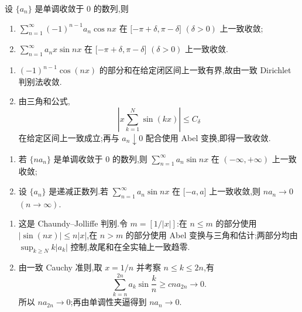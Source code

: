 \begin{example}
    设 $\{a_n\}$ 是单调收敛于 $0$ 的数列,则
    \begin{enumerate}
        \item $\displaystyle\sum\limits_{n=1}^{\infty}(-1)^{n-1}a_n\cos nx$ 在 $\lbrack -\pi+\delta,\pi-\delta\rbrack$ $(\delta>0)$ 上一致收敛;
        \item $\displaystyle\sum\limits_{n=1}^{\infty}a_nx\sin nx$ 在 $\lbrack -\pi+\delta,\pi-\delta\rbrack$ $(\delta>0)$ 上一致收敛.
    \end{enumerate}
\end{example}
\exampleblank

\begin{solution}
    \leavevmode
    \begin{enumerate}
        \item $(-1)^{n-1}\cos(nx)$ 的部分和在给定闭区间上一致有界,故由一致 Dirichlet 判别法收敛.
        \item 由三角和公式,
              \[
                  \left|x\sum\limits_{k=1}^{N}\sin(kx)\right|
                  \leq C_\delta
              \]
              在给定区间上一致成立;再与 $a_n\downarrow0$ 配合使用 Abel 变换,即得一致收敛.
    \end{enumerate}
\end{solution}

\begin{example}
    \begin{enumerate}
        \item 若 $\{na_n\}$ 是单调收敛于 $0$ 的数列,则 $\displaystyle\sum\limits_{n=1}^{\infty}a_n\sin nx$ 在 $(-\infty,+\infty)$ 上一致收敛;
        \item 设 $\{a_n\}$ 是递减正数列.若 $\displaystyle\sum\limits_{n=1}^{\infty}a_n\sin nx$ 在 $\lbrack -a,a\rbrack$ 上一致收敛,则 $na_n\to0$ $(n\to\infty)$.
    \end{enumerate}
\end{example}
\exampleblank

\begin{solution}
    \leavevmode
    \begin{enumerate}
        \item 这是 Chaundy--Jolliffe 判别.令 $m=[1/|x|]$:在 $n\leq m$ 的部分使用 $|\sin(nx)|\leq n|x|$,在 $n>m$ 的部分使用 Abel 变换与三角和估计;两部分均由 $\sup_{k\geq N}k|a_k|$ 控制,故尾和在全实轴上一致趋零.
        \item 由一致 Cauchy 准则,取 $x=1/n$ 并考察 $n\leq k\leq2n$,有
              \[
                  \displaystyle\sum\limits_{k=n}^{2n}a_k\sin\dfrac{k}{n}\geq cna_{2n}\longrightarrow0.
              \]
              所以 $na_{2n}\to0$;再由单调性夹逼得到 $na_n\to0$.
    \end{enumerate}
\end{solution}

